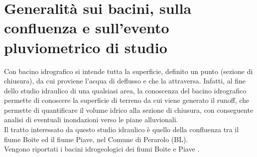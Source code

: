 \section{Generalità sui bacini, sulla confluenza e sull'evento pluviometrico di studio}
\label{section:evento_pluviometrico}
Con bacino idrografico si intende tutta la superficie, definito un punto (sezione di chiusura), da cui proviene l'acqua di deflusso e che la attraversa. Infatti, al fine dello studio idraulico di una qualsiasi area, la conoscenza del bacino idrografico permette di conoscere la superficie di terreno da cui viene generato il runoff, che permette di quantificare il volume idrico alla sezione di chiusura, con conseguente analisi di eventuali inondazioni verso le piane alluvionali.\\
Il tratto interessato da questo studio idraulico è quello della confluenza tra il fiume Boite ed il fiume Piave, nel Comune di Perarolo (BL).\\
Vengono riportati i bacini idrogeologici dei fiumi Boite \cite{fiume_boite} e Piave \cite{fiume_piave}.
